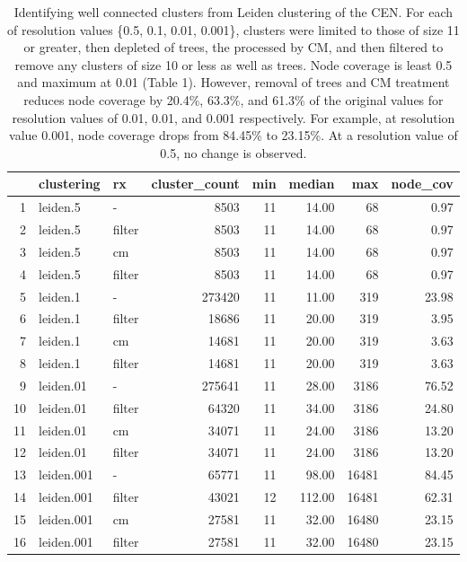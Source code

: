 \documentclass[12pt, oneside]{article}   	%
\begin{document}
\begin{table}[ht]
\centering
\begin{tabular}{rllrrrrr}
  \hline
 & clustering & rx & cluster\_count & min & median & max & node\_cov \\ 
  \hline
1 & leiden.5 & -  & 8503 &  11 & 14.00 &  68 & 0.97 \\ 
  2 & leiden.5 & filter & 8503 &  11 & 14.00 &  68 & 0.97 \\ 
  3 & leiden.5 & cm & 8503 &  11 & 14.00 &  68 & 0.97 \\ 
  4 & leiden.5 & filter & 8503 &  11 & 14.00 &  68 & 0.97 \\ 
  5 & leiden.1 & - & 273420 &  11 & 11.00 & 319 & 23.98 \\ 
  6 & leiden.1 & filter & 18686 &  11 & 20.00 & 319 & 3.95 \\ 
  7 & leiden.1 & cm & 14681 &  11 & 20.00 & 319 & 3.63 \\ 
  8 & leiden.1 & filter & 14681 &  11 & 20.00 & 319 & 3.63 \\ 
  9 & leiden.01 & -& 275641 &  11 & 28.00 & 3186 & 76.52 \\ 
  10 & leiden.01 & filter & 64320 &  11 & 34.00 & 3186 & 24.80 \\ 
  11 & leiden.01 & cm & 34071 &  11 & 24.00 & 3186 & 13.20 \\ 
  12 & leiden.01 & filter & 34071 &  11 & 24.00 & 3186 & 13.20 \\ 
  13 & leiden.001 & - & 65771 &  11 & 98.00 & 16481 & 84.45 \\ 
  14 & leiden.001 & filter & 43021 &  12 & 112.00 & 16481 & 62.31 \\ 
  15 & leiden.001 & cm & 27581 &  11 & 32.00 & 16480 & 23.15 \\ 
  16 & leiden.001 & filter & 27581 &  11 & 32.00 & 16480 & 23.15 \\ 
   \hline
\end{tabular}
\caption{Identifying well connected clusters from Leiden clustering of the CEN. For each of resolution values \{0.5, 0.1, 0.01, 0.001\}, clusters were limited to those of size 11 or greater, then depleted of trees, the processed by CM, and then filtered to remove any clusters of size 10 or less as well as trees. Node coverage is least 0.5 and maximum at 0.01 (Table 1). However, removal of trees and CM treatment reduces node coverage by 20.4\%, 63.3\%, and 61.3\% of the original values for resolution values of 0.01, 0.01, and 0.001 respectively.  For example, at resolution value 0.001, node coverage drops from 84.45\% to 23.15\%. At a resolution value of 0.5, no change is observed.}
\label{tab:table2}
\end{table}
\end{document}
